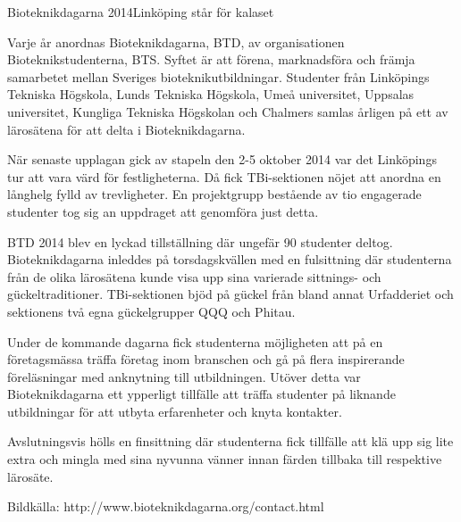 \begin{news}{2}{Bioteknikdagarna 2014}{Linköping står för kalaset}{}{}


Varje år anordnas Bioteknikdagarna, BTD, av organisationen
Bioteknikstudenterna, BTS. Syftet är att förena, marknadsföra och
främja samarbetet mellan Sveriges bioteknikutbildningar. Studenter
från Linköpings Tekniska Högskola, Lunds Tekniska Högskola, Umeå
universitet, Uppsalas universitet, Kungliga Tekniska Högskolan och
Chalmers samlas årligen på ett av lärosätena för att delta i
Bioteknikdagarna.

När senaste upplagan gick av stapeln den 2-5 oktober 2014 var det
Linköpings tur att vara värd för festligheterna. Då fick TBi-sektionen
nöjet att anordna en långhelg fylld av trevligheter.  En projektgrupp
bestående av tio engagerade studenter tog sig an uppdraget att
genomföra just detta.

BTD 2014 blev en lyckad tillställning där ungefär 90 studenter
deltog. Bioteknikdagarna inleddes på torsdagskvällen med en
fulsittning där studenterna från de olika lärosätena kunde visa upp
sina varierade sittnings- och gückeltraditioner. TBi-sektionen bjöd på
gückel från bland annat Urfadderiet och sektionens två egna
gückelgrupper QQQ och Phitau.

Under de kommande dagarna fick studenterna möjligheten att på en
företagsmässa träffa företag inom branschen och gå på flera
inspirerande föreläsningar med anknytning till utbildningen. Utöver
detta var Bioteknikdagarna ett ypperligt tillfälle att träffa
studenter på liknande utbildningar för att utbyta erfarenheter och
knyta kontakter.

Avslutningsvis hölls en finsittning där studenterna fick tillfälle att
klä upp sig lite extra och mingla med sina nyvunna vänner innan färden
tillbaka till respektive lärosäte.


Bildkälla: http://www.bioteknikdagarna.org/contact.html

\end{news}
